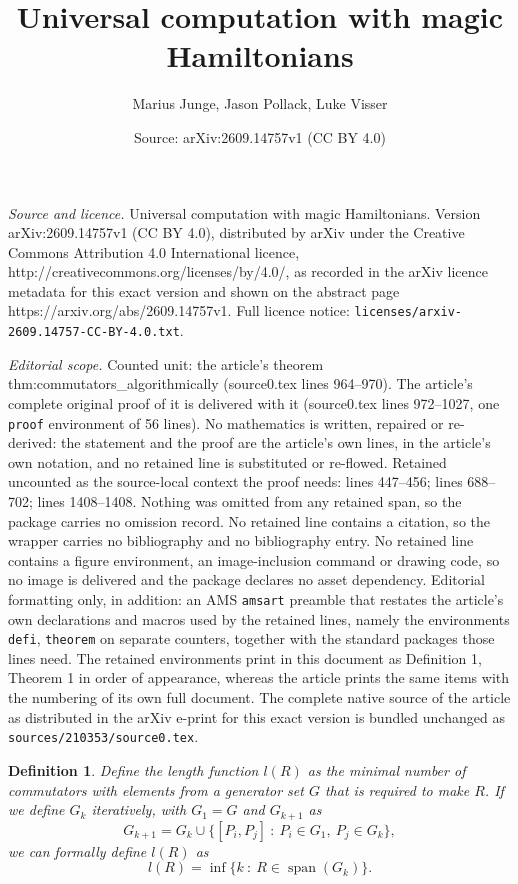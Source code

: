 \documentclass[10pt,a4paper]{amsart}
\title{Universal computation with magic Hamiltonians}
\author{Marius Junge, Jason Pollack, Luke Visser}
\date{Source: arXiv:2609.14757v1 (CC BY 4.0)}
\newtheorem{defi}{Definition}
\begin{document}
\maketitle

\noindent\emph{Source and licence.} Universal computation with magic Hamiltonians. Version arXiv:2609.14757v1 (CC BY 4.0), distributed by arXiv under the Creative Commons Attribution 4.0 International licence, http://creativecommons.org/licenses/by/4.0/, as recorded in the arXiv licence metadata for this exact version and shown on the abstract page https://arxiv.org/abs/2609.14757v1. Full licence notice: \texttt{licenses/arxiv-2609.14757-CC-BY-4.0.txt}.\par\smallskip

\noindent\textit{Editorial scope.} Counted unit: the article's theorem thm:commutators\_algorithmically (source0.tex lines 964--970). The article's complete original proof of it is delivered with it (source0.tex lines 972--1027, one \texttt{proof} environment of 56 lines). No mathematics is written, repaired or re-derived: the statement and the proof are the article's own lines, in the article's own notation, and no retained line is substituted or re-flowed.  Retained uncounted as the source-local context the proof needs: lines 447--456; lines 688--702; lines 1408--1408.  Nothing was omitted from any retained span, so the package carries no omission record.  No retained line contains a citation, so the wrapper carries no bibliography and no bibliography entry.  No retained line contains a figure environment, an image-inclusion command or drawing code, so no image is delivered and the package declares no asset dependency.  Editorial formatting only, in addition: an AMS \texttt{amsart} preamble that restates the article's own declarations and macros used by the retained lines, namely the environments \texttt{defi}, \texttt{theorem} on separate counters, together with the standard packages those lines need.  The retained environments print in this document as Definition 1, Theorem 1 in order of appearance, whereas the article prints the same items with the numbering of its own full document.  The complete native source of the article as distributed in the arXiv e-print for this exact version is bundled unchanged as \texttt{sources/210353/source0.tex}.
\begin{defi}\label{def:length_function}
    Define the length function $l(R)$ as the minimal number of commutators with elements from a generator set $G$ that is required to make $R$. If we define $G_k$ iteratively, with $G_1 = G$ and $G_{k+1}$ as 
    \begin{equation}
        G_{k+1} = G_k \cup \{[P_i, P_j] ~:~ P_i \in G_1,~ P_j \in G_k \},
    \end{equation}
    we can formally define $l(R)$ as
    \begin{equation}
        l(R)=\inf \big\{ k ~:~ R \in \operatorname{span}(G_k)\}.
    \end{equation}
\end{defi}
\end{document}
